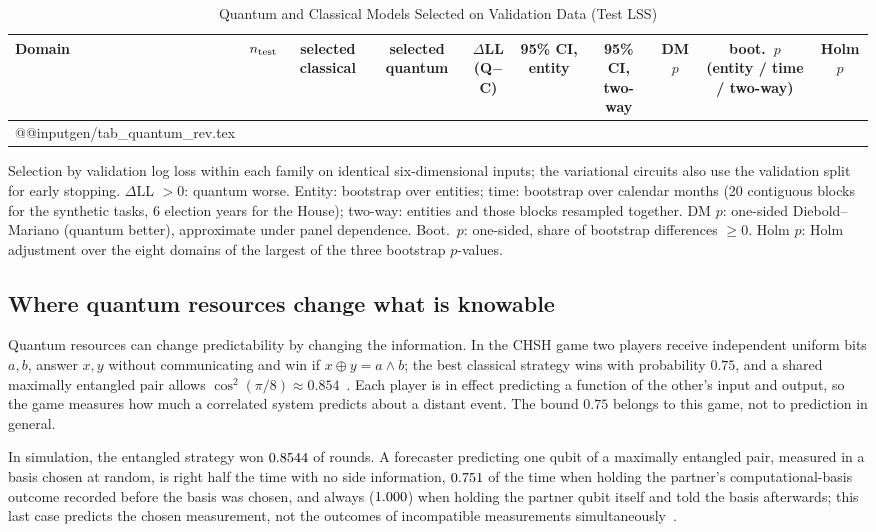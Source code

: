 \documentclass[journal]{IEEEtran}
\theoremstyle{definition}
\begin{document}
\begin{table}[!t]
\caption{Quantum and Classical Models Selected on Validation Data (Test LSS)}
\label{tab:quantum}
\centering
\scriptsize
\setlength{\tabcolsep}{2.3pt}
\begin{tabular}{@{}lrcccccccc@{}}
\toprule
Domain & $n_{\rm test}$ & selected classical & selected quantum & $\Delta$LL (Q$-$C) & 95\% CI, entity & 95\% CI, two-way & DM $p$ & boot.\ $p$ (entity / time / two-way) & Holm $p$\\
\midrule
\csname @@input\endcsname gen/tab_quantum_rev.tex
\bottomrule
\end{tabular}
\vspace{2pt}

\parbox{\textwidth}{\footnotesize Selection by validation log loss within each family on identical six-dimensional inputs; the variational circuits also use the validation split for early stopping. $\Delta$LL $>0$: quantum worse. Entity: bootstrap over entities; time: bootstrap over calendar months (20 contiguous blocks for the synthetic tasks, 6 election years for the House); two-way: entities and those blocks resampled together. DM $p$: one-sided Diebold--Mariano (quantum better), approximate under panel dependence. Boot.\ $p$: one-sided, share of bootstrap differences $\ge0$. Holm $p$: Holm adjustment over the eight domains of the largest of the three bootstrap $p$-values.}
\end{table}

\subsection{Where quantum resources change what is knowable}\label{sec:res-side}
Quantum resources can change predictability by changing the information. In the CHSH game two players receive independent uniform bits $a,b$, answer $x,y$ without communicating and win if $x\oplus y=a\wedge b$; the best classical strategy wins with probability $0.75$, and a shared maximally entangled pair allows $\cos^2(\pi/8)\approx0.854$~\cite{clauser1969proposed,tsirelson1980quantum}. Each player is in effect predicting a function of the other's input and output, so the game measures how much a correlated system predicts about a distant event. The bound $0.75$ belongs to this game, not to prediction in general.

In simulation, the entangled strategy won $0.8544$ of rounds. A forecaster predicting one qubit of a maximally entangled pair, measured in a basis chosen at random, is right half the time with no side information, $0.751$ of the time when holding the partner's computational-basis outcome recorded before the basis was chosen, and always ($1.000$) when holding the partner qubit itself and told the basis afterwards; this last case predicts the chosen measurement, not the outcomes of incompatible measurements simultaneously~\cite{berta2010uncertainty,konig2009operational}.
\end{document}
